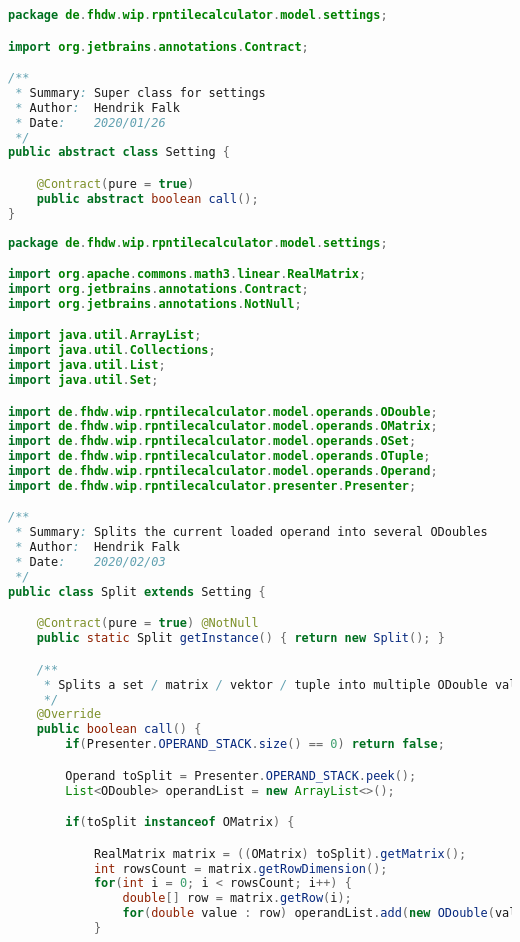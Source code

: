 \begin{lstlisting}[caption=Setting (Falk),label=list:Setting,language=Java]
package de.fhdw.wip.rpntilecalculator.model.settings;

import org.jetbrains.annotations.Contract;

/**
 * Summary: Super class for settings
 * Author:  Hendrik Falk
 * Date:    2020/01/26
 */
public abstract class Setting {

    @Contract(pure = true)
    public abstract boolean call();
}

\end{lstlisting}    

\begin{lstlisting}[caption=Split (Falk),label=list:Split,language=Java]
package de.fhdw.wip.rpntilecalculator.model.settings;

import org.apache.commons.math3.linear.RealMatrix;
import org.jetbrains.annotations.Contract;
import org.jetbrains.annotations.NotNull;

import java.util.ArrayList;
import java.util.Collections;
import java.util.List;
import java.util.Set;

import de.fhdw.wip.rpntilecalculator.model.operands.ODouble;
import de.fhdw.wip.rpntilecalculator.model.operands.OMatrix;
import de.fhdw.wip.rpntilecalculator.model.operands.OSet;
import de.fhdw.wip.rpntilecalculator.model.operands.OTuple;
import de.fhdw.wip.rpntilecalculator.model.operands.Operand;
import de.fhdw.wip.rpntilecalculator.presenter.Presenter;

/**
 * Summary: Splits the current loaded operand into several ODoubles
 * Author:  Hendrik Falk
 * Date:    2020/02/03
 */
public class Split extends Setting {

    @Contract(pure = true) @NotNull
    public static Split getInstance() { return new Split(); }

    /**
     * Splits a set / matrix / vektor / tuple into multiple ODouble values
     */
    @Override
    public boolean call() {
        if(Presenter.OPERAND_STACK.size() == 0) return false;

        Operand toSplit = Presenter.OPERAND_STACK.peek();
        List<ODouble> operandList = new ArrayList<>();

        if(toSplit instanceof OMatrix) {

            RealMatrix matrix = ((OMatrix) toSplit).getMatrix();
            int rowsCount = matrix.getRowDimension();
            for(int i = 0; i < rowsCount; i++) {
                double[] row = matrix.getRow(i);
                for(double value : row) operandList.add(new ODouble(value));
            }


\end{lstlisting}
